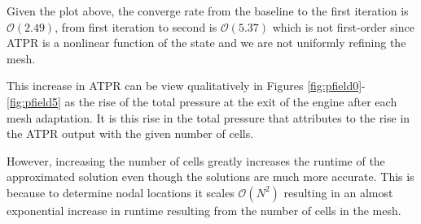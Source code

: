 Given the plot above, the converge rate from the baseline to the first iteration is $\mathcal{O}(2.49)$, from first iteration to second is $\mathcal{O}(5.37)$ which is not first-order since ATPR is a nonlinear function of the state and we are not uniformly refining the mesh.

This increase in ATPR can be view qualitatively in Figures \ref{fig:pfield0}-\ref{fig:pfield5} as the rise of the total pressure at the exit of the engine after each mesh adaptation. It is this rise in the total pressure that attributes to the rise in the ATPR output with the given number of cells.

However, increasing the number of cells greatly increases the runtime of the approximated solution even though the solutions are much more accurate. This is because to determine nodal locations it scales $\mathcal{O}(N^2)$ resulting in an almost exponential increase in runtime resulting from the number of cells in the mesh.

